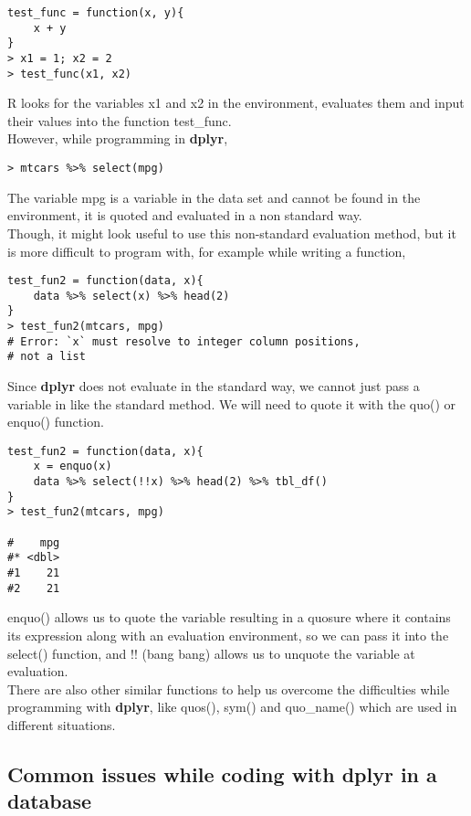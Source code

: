 \begin{lstlisting}
test_func = function(x, y){
    x + y
}  
> x1 = 1; x2 = 2
> test_func(x1, x2)
\end{lstlisting}
{\sf R} looks for the variables {\ttfamily x1} and {\ttfamily x2} in the environment, evaluates them and input their values into the function {\ttfamily test\_func}. \\

However, while programming in {\bf dplyr},
\begin{lstlisting}
> mtcars %>% select(mpg)
\end{lstlisting}
The variable {\ttfamily mpg} is a variable in the data set and cannot be found in the environment, it is quoted and evaluated in a non standard way.\\

Though, it might look useful to use this non-standard evaluation method, but it is more difficult to program with, for example while writing a function,

\begin{lstlisting}
test_fun2 = function(data, x){
    data %>% select(x) %>% head(2)
}
> test_fun2(mtcars, mpg)
# Error: `x` must resolve to integer column positions, 
# not a list 
\end{lstlisting}

Since {\bf dplyr} does not evaluate in the standard way, we cannot just pass a variable in like the standard method. We will need to quote it with the {\ttfamily quo()} or {\ttfamily enquo()} function.

\begin{lstlisting}
test_fun2 = function(data, x){
    x = enquo(x)
    data %>% select(!!x) %>% head(2) %>% tbl_df()
}
> test_fun2(mtcars, mpg)
    
#    mpg
#* <dbl>
#1    21
#2    21
\end{lstlisting}
{\ttfamily enquo()} allows us to quote the variable resulting in a quosure where it contains its expression along with an evaluation environment, so we can pass it into the {\ttfamily select()} function, and {\ttfamily !!} (bang bang) allows us to unquote the variable at evaluation. \\

There are also other similar functions to help us overcome the difficulties while programming with  {\bf dplyr}, like {\ttfamily quos()}, {\ttfamily sym()} and {\ttfamily quo\_name()} which are used in different situations.

\subsection{Common issues while coding with dplyr in a database}

